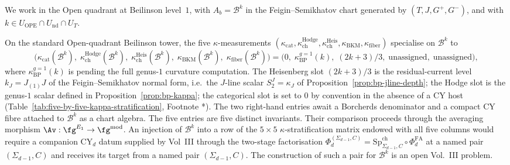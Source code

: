 \begin{remark}
\label{rem:bp-5x5-kappa-row}
We work in the Open quadrant at Beilinson level~$1$, with
$A_b=\mathcal{B}^k$ in the Feigin--Semikhatov chart generated by
$(T,J,G^+,G^-)$, and with
$k\in U_{\mathrm{OPE}}\cap U_{\mathrm{nd}}\cap U_T$.

On the standard Open-quadrant Beilinson tower, the five
$\kappa$-measurements
$(\kappa_{\mathrm{cat}},\kappa^{\mathrm{Hodge}}_{\mathrm{ch}},
\kappa^{\mathrm{Heis}}_{\mathrm{ch}},\kappa_{\mathrm{BKM}},
\kappa_{\mathrm{fiber}})$ specialise on $\mathcal{B}^k$ to
\[
\bigl(\kappa_{\mathrm{cat}}(\mathcal{B}^k),\;
\kappa^{\mathrm{Hodge}}_{\mathrm{ch}}(\mathcal{B}^k),\;
\kappa^{\mathrm{Heis}}_{\mathrm{ch}}(\mathcal{B}^k),\;
\kappa_{\mathrm{BKM}}(\mathcal{B}^k),\;
\kappa_{\mathrm{fiber}}(\mathcal{B}^k)\bigr)
=\bigl(0,\;\kappa_{\mathrm{BP}}^{g=1}(k),\;
(2k{+}3)/3,\;\text{unassigned},\;\text{unassigned}\bigr),
\]
where $\kappa_{\mathrm{BP}}^{g=1}(k)$ is
\ClaimStatusOpen{} pending the full genus-$1$ curvature computation.
The Heisenberg slot $(2k+3)/3$ is the residual-current level
$k_J=J_{(1)}J$ of the Feigin--Semikhatov normal form,
i.e.\ the $J$-line scalar $S_2^J=\kappa_J$ of
Proposition~\ref{prop:bp-jline-depth}; the Hodge slot is the
genus-$1$ scalar defined in Proposition~\ref{prop:bp-kappa}; the categorical slot is set to
$0$ by convention in the absence of a CY host
(Table~\ref{tab:five-by-five-kappa-stratification},
Footnote *).
The two right-hand entries await a Borcherds denominator and a compact
CY fibre attached to $\mathcal{B}^k$ as a chart algebra. The five
entries are five distinct invariants.  Their comparison proceeds through the
averaging morphism
$\Av:\fg^{E_1}\to\fg^{\mathrm{mod}}$. An injection of
$\mathcal{B}^k$ into a row of the
$5\times5$ $\kappa$-stratification matrix endowed with all five
columns would require a companion CY${}_d$ datum supplied by
Vol~III through the two-stage factorisation
$\Phi_d^{(\Sigma_{d-1},C)}=\mathrm{Sp}^{\mathrm{ch}}_{\Sigma_{d-1},C}
\circ\Phi_d^{\mathrm{FA}}$ at a named pair $(\Sigma_{d-1},C)$
and receives its target from a named pair $(\Sigma_{d-1},C)$.  The
construction of such a pair for $\mathcal{B}^k$ is an open Vol.~III
problem.
\end{remark}

